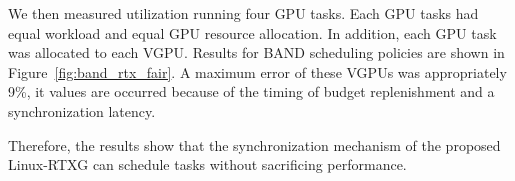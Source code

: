 We then measured utilization running four GPU tasks.
Each GPU tasks had equal workload and equal GPU resource allocation.
In addition, each GPU task was allocated to each VGPU.
Results for BAND scheduling policies are shown in Figure~\ref{fig:band_rtx_fair}.
A maximum error of these VGPUs was appropriately 9\%, it values are occurred because of the timing of budget replenishment and a synchronization latency.  

Therefore, the results show that the synchronization mechanism of the proposed Linux-RTXG can schedule tasks without sacrificing performance.

\begin{figure}[!t]
\begin{minipage}[t]{0.33\hsize}
\begin{center}
\label{fig:real-null_null}
\label{fig:real-prio_null}
\end{center}
\end{minipage}
\begin{minipage}[t]{0.33\hsize}
\begin{center}

\end{center}
\end{minipage}
\end{figure}
